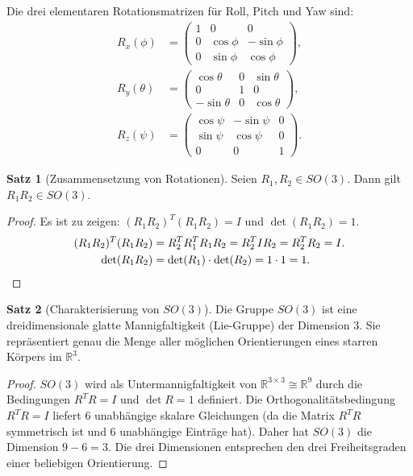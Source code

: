 ﻿\documentclass[a4paper,12pt]{article}
\theoremstyle{definition}
\newtheorem{satz}{Satz}
\begin{document}
Die drei elementaren Rotationsmatrizen für Roll, Pitch und Yaw sind:
\begin{align*}
	R_x(\phi) &= \begin{pmatrix} 1 & 0 & 0 \\ 0 & \cos\phi & -\sin\phi \\ 0 & \sin\phi & \cos\phi \end{pmatrix}, \\[4pt]
	R_y(\theta) &= \begin{pmatrix} \cos\theta & 0 & \sin\theta \\ 0 & 1 & 0 \\ -\sin\theta & 0 & \cos\theta \end{pmatrix}, \\[4pt]
	R_z(\psi) &= \begin{pmatrix} \cos\psi & -\sin\psi & 0 \\ \sin\psi & \cos\psi & 0 \\ 0 & 0 & 1 \end{pmatrix}.
\end{align*}

\begin{satz}[Zusammensetzung von Rotationen]
\label{satz:rotation}
	Seien $R_1, R_2 \in SO(3)$. Dann gilt $R_1 R_2 \in SO(3)$.
\end{satz}

\begin{proof}
	Es ist zu zeigen: $(R_1 R_2)^T (R_1 R_2) = I$ und $\det(R_1 R_2) = 1$.
	\begin{align*}
		(R_1 R_2)^T (R_1 R_2) &= R_2^T R_1^T R_1 R_2 = R_2^T I R_2 = R_2^T R_2 = I. \\
		\det(R_1 R_2) &= \det(R_1) \cdot \det(R_2) = 1 \cdot 1 = 1. \qedhere
	\end{align*}
\end{proof}

\begin{satz}[Charakterisierung von $SO(3)$]
\label{satz:so3dim}
	Die Gruppe $SO(3)$ ist eine dreidimensionale glatte Mannigfaltigkeit (Lie-Gruppe) der Dimension 3. Sie repräsentiert genau die Menge aller möglichen Orientierungen eines starren Körpers im $\mathbb{R}^3$.
\end{satz}

\begin{proof}
	$SO(3)$ wird als Untermannigfaltigkeit von $\mathbb{R}^{3\times 3} \cong \mathbb{R}^9$ durch die Bedingungen $R^T R = I$ und $\det R = 1$ definiert. Die Orthogonalitätsbedingung $R^TR = I$ liefert $6$ unabhängige skalare Gleichungen (da die Matrix $R^TR$ symmetrisch ist und $6$ unabhängige Einträge hat). Daher hat $SO(3)$ die Dimension $9 - 6 = 3$. Die drei Dimensionen entsprechen den drei Freiheitsgraden einer beliebigen Orientierung. \qedhere
\end{proof}
\end{document}
